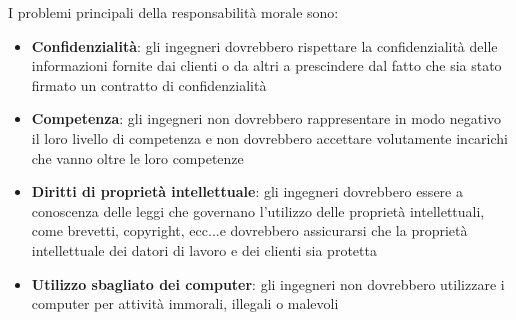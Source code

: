 \documentclass[a4paper]{article}
\begin{document}
I problemi principali della responsabilità morale sono:
\begin{itemize}
  \item \textbf{Confidenzialità}: gli ingegneri dovrebbero rispettare la confidenzialità
    delle informazioni fornite dai clienti o da altri a prescindere dal fatto che sia
    stato firmato un contratto di confidenzialità

  \item \textbf{Competenza}: gli ingegneri non dovrebbero rappresentare in modo negativo
    il loro livello di competenza e non dovrebbero accettare volutamente incarichi che
    vanno oltre le loro competenze

  \item \textbf{Diritti di proprietà intellettuale}: gli ingegneri dovrebbero essere a
    conoscenza delle leggi che governano l'utilizzo delle proprietà intellettuali, come
    brevetti, copyright, ecc...e dovrebbero assicurarsi che la proprietà intellettuale
    dei datori di lavoro e dei clienti sia protetta 

  \item \textbf{Utilizzo sbagliato dei computer}: gli ingegneri non dovrebbero utilizzare
    i computer per attività immorali, illegali o malevoli
\end{itemize}
\end{document}
